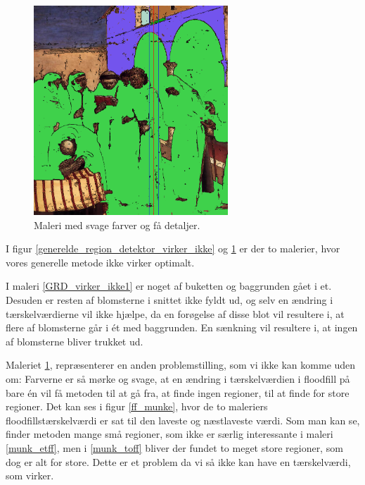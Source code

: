 \begin{figure}[!h]
	\begin{center}
	    \includegraphics[angle=0,width=0.65\textwidth]{afsnit/afprovning/billeder/thressholds/svage_farver/svage_detalier/floodfill/4-4.png}
	\end{center}    
	\caption{Maleri med svage farver og få detaljer.}
    \label{GRD_virker_ikke2}
\end{figure}

I figur \ref{generelde_region_detektor_virker_ikke} og
\ref{GRD_virker_ikke2} er der to malerier, hvor
vores generelle metode ikke virker optimalt. 

I maleri \ref{GRD_virker_ikke1} er noget af buketten og baggrunden gået
i et. Desuden er resten af blomsterne i snittet ikke fyldt ud, og selv
en ændring i tærskelværdierne vil ikke hjælpe, da en forøgelse af disse
blot vil resultere i, at flere af blomsterne går i ét med baggrunden. En
sænkning vil resultere i, at ingen af blomsterne bliver trukket ud. 

Maleriet \ref{GRD_virker_ikke2}, repræsenterer en anden problemstilling,
som vi ikke kan komme uden om: Farverne er så mørke og svage, at en
ændring i tærskelværdien i floodfill på bare \'{e}n vil få metoden til at gå
fra, at finde ingen regioner, til at finde for store regioner. Det kan ses
i figur \ref{ff_munke}, hvor de to maleriers floodfillstærskelværdi
er sat til den laveste og næstlaveste værdi. Som man kan se, finder metoden
mange små regioner, som ikke er særlig interessante i maleri
\ref{munk_etff}, men i \ref{munk_toff} bliver der fundet to meget store
regioner, som dog er alt for store. Dette er et problem da vi så ikke
kan have en tærskelværdi, som virker.


